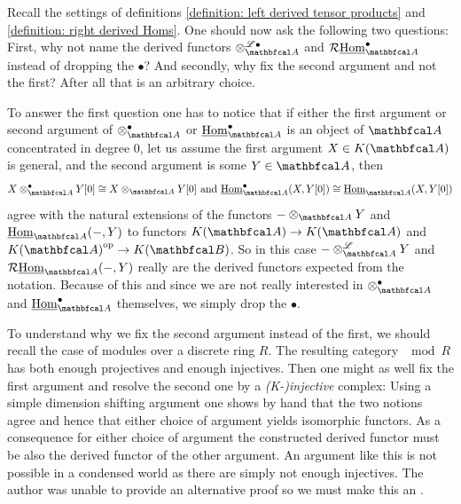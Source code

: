 \begin{remark}
	\label{remark: about the notation and choices}
	
	Recall the settings of definitions \ref{definition: left derived tensor products} and \ref{definition: right derived Homs}. One should now ask the following two questions: First, why not name the derived functors $\otimes^{\LeftD\bullet}_\category{A}$ and $\RightD\eHom_\category{A}^\bullet$ instead of dropping the $\bullet$? And secondly, why fix the second argument and not the first? After all that is an arbitrary choice.
	
	To answer the first question one has to notice that if either the first argument or second argument of $\otimes_\category{A}^\bullet$ or $\eHom_\category{A}^\bullet$ is an object of $\category{A}$ concentrated in degree $0$, let us assume the first argument $X\in\homotopyCategoryOfComplexes{\category{A}}$ is general, and the second argument is some $Y\in\category{A}$, then
	$$X\otimes_\category{A}^\bullet Y[0] \cong X\otimes_\category{A} Y[0]\text{ and }\eHom_\category{A}^\bullet(X, Y[0])\cong \eHom_\category{A}(X, Y[0])$$
	agree with the natural extensions of the functors $-\otimes_\category{A} Y$ and $\eHom_\category{A}(-, Y)$ to functors $\homotopyCategoryOfComplexes{\category{A}}\to\homotopyCategoryOfComplexes{\category{A}}$ and $\homotopyCategoryOfComplexes{\category{A}}^\op \to \homotopyCategoryOfComplexes{\category{B}}$. So in this case $- \Dotimes_\category{A} Y$ and $\RightD\eHom_\category{A}(-, Y)$ really are the derived functors expected from the notation. Because of this and since we are not really interested in $\otimes_{\category{A}}^\bullet$ and $\eHom_\category{A}^\bullet$ themselves, we simply drop the $\bullet$.
	
	To understand why we fix the second argument instead of the first, we should recall the case of modules over a discrete ring $R$. The resulting category $\mod{R}$ has both enough projectives and enough injectives. Then one might as well fix the first argument and resolve the second one by a \emph{(K-)injective} complex: Using a simple dimension shifting argument one shows by hand that the two notions agree and hence that either choice of argument yields isomorphic functors. As a consequence for either choice of argument the constructed derived functor must be also the derived functor of the other argument. An argument like this is not possible in a condensed world as there are simply not enough injectives. The author was unable to provide an alternative proof so we must make this an \assumptionPreWord.
\end{remark}

